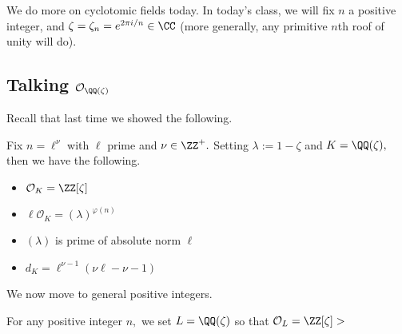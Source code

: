 \documentclass[../notes.tex]{subfiles}
\begin{document}














We do more on cyclotomic fields today. In today's class, we will fix $n$ a positive integer, and $\zeta=\zeta_n=e^{2\pi i/n}\in\CC$ (more generally, any primitive $n$th roof of unity will do).

\subsection{Talking \texorpdfstring{$\mathcal O_{\QQ(\zeta)}$}{}}
Recall that last time we showed the following.
\begin{proposition}
	Fix $n=\ell^\nu$ with $\ell$ prime and $\nu\in\ZZ^+.$ Setting $\lambda:=1-\zeta$ and $K=\QQ(\zeta),$ then we have the following.
	\begin{itemize}
		\item $\mathcal O_K=\ZZ[\zeta]$
		\item $\ell\mathcal O_K=(\lambda)^{\varphi(n)}$
		\item $(\lambda)$ is prime of absolute norm $\ell$
		\item $d_K=\ell^{\nu-1}(\nu\ell-\nu-1)$
	\end{itemize}
\end{proposition}
We now move to general positive integers.
\begin{proposition}
	For any positive integer $n,$ we set $L=\QQ(\zeta)$ so that $\mathcal O_L=\ZZ[\zeta]>$
\end{proposition}
\end{document}
